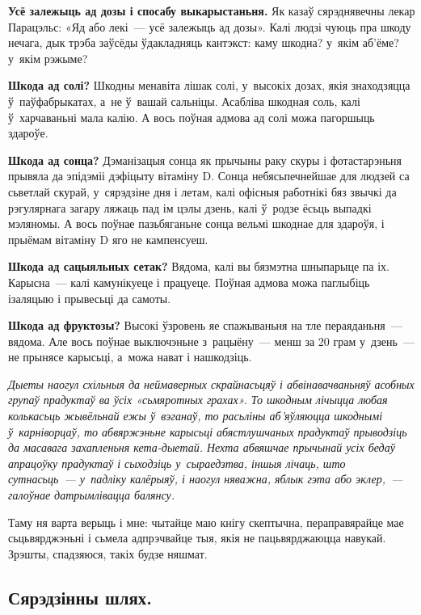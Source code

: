 \textbf{Усё залежыць ад дозы і спосабу выкарыстаньня.} Як казаў сярэднявечны лекар Парацэльс: «Яд або лекі~--- усё залежыць ад дозы». Калі людзі чуюць пра шкоду нечага, дык трэба заўсёды ўдакладняць кантэкст: каму шкодна? у~якім аб'ёме? у~якім рэжыме?

\textbf{Шкода ад солі?} Шкодны менавіта лішак солі, у~высокіх дозах, якія знаходзяцца ў~паўфабрыкатах, а~не ў~вашай сальніцы. Асабліва шкодная соль, калі ў~харчаваньні мала калію. А вось поўная адмова ад солі можа пагоршыць здароўе.

\textbf{Шкода ад сонца?} Дэманізацыя сонца як прычыны раку скуры і фотастарэньня прывяла да эпідэміі дэфіцыту вітаміну D. Сонца небясьпечнейшае для людзей са сьветлай скурай, у~сярэдзіне дня і летам, калі офісныя работнікі бяз звычкі да рэгулярнага загару ляжаць пад ім цэлы дзень, калі ў~родзе ёсьць выпадкі мэляномы. А вось поўнае пазьбяганьне сонца вельмі шкоднае для здароўя, і прыёмам вітаміну D яго не кампенсуеш.

\textbf{Шкода ад сацыяльных сетак?} Вядома, калі вы бязмэтна шныпарыце па іх. Карысна~--- калі камунікуеце і працуеце. Поўная адмова можа паглыбіць ізаляцыю і прывесьці да самоты.

\textbf{Шкода ад фруктозы?} Высокі ўзровень яе спажываньня на тле пераяданьня~--- вядома. Але вось поўнае выключэньне з~рацыёну~--- менш за 20 грам у~дзень~--- не прынясе карысьці, а~можа нават і нашкодзіць.

\emph{Дыеты наогул схільныя да неймаверных скрайнасьцяў і абвінавачваньняў асобных групаў прадуктаў ва ўсіх «сьмяротных грахах». То шкодным лічыцца любая колькасьць жывёльнай ежы ў~вэганаў, то расьліны аб'яўляюцца шкоднымі ў~карніворцаў, то абвяржэньне карысьці абястлушчаных прадуктаў прыводзіць да масавага захапленьня кета-дыетай. Нехта абвяшчае прычынай усіх бедаў апрацоўку прадуктаў і сыходзіць у~сыраедзтва, іншыя лічаць, што сутнасьць~--- у~падліку калёрыяў, і наогул няважна, яблык гэта або эклер,~--- галоўнае датрымлівацца балянсу.}


Таму ня варта верыць і мне: чытайце маю кнігу скептычна, пераправярайце мае сьцьвярджэньні і сьмела адпрэчвайце тыя, якія не пацьвярджаюцца навукай. Зрэшты, спадзяюся, такіх будзе няшмат.

\subsection*{Сярэдзінны шлях.}

